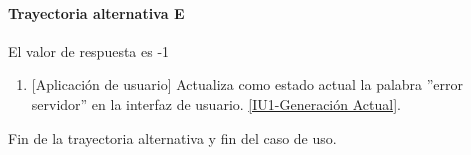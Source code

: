 \paragraph{Trayectoria alternativa E} \label{SUB-U-CU1.1:TE}
	El valor de respuesta es -1
	\begin{enumerate}[label=E\arabic*.]
		\item {[Aplicación de usuario]} Actualiza como estado actual la palabra ''error servidor'' en la interfaz de usuario. \hyperref[fig:monitoreo]{[IU1-Generación Actual]}.
	\end{enumerate}
	Fin de la trayectoria alternativa y fin del caso de uso.
